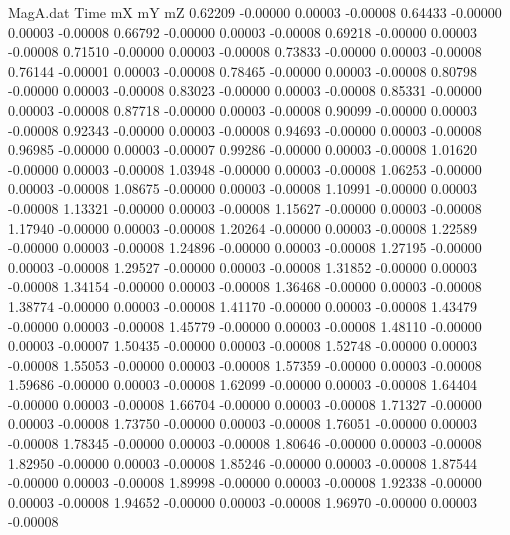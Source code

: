 \begin{filecontents}{MagA.dat}
Time mX mY mZ
   0.62209   -0.00000    0.00003   -0.00008
   0.64433   -0.00000    0.00003   -0.00008
   0.66792   -0.00000    0.00003   -0.00008
   0.69218   -0.00000    0.00003   -0.00008
   0.71510   -0.00000    0.00003   -0.00008
   0.73833   -0.00000    0.00003   -0.00008
   0.76144   -0.00001    0.00003   -0.00008
   0.78465   -0.00000    0.00003   -0.00008
   0.80798   -0.00000    0.00003   -0.00008
   0.83023   -0.00000    0.00003   -0.00008
   0.85331   -0.00000    0.00003   -0.00008
   0.87718   -0.00000    0.00003   -0.00008
   0.90099   -0.00000    0.00003   -0.00008
   0.92343   -0.00000    0.00003   -0.00008
   0.94693   -0.00000    0.00003   -0.00008
   0.96985   -0.00000    0.00003   -0.00007
   0.99286   -0.00000    0.00003   -0.00008
   1.01620   -0.00000    0.00003   -0.00008
   1.03948   -0.00000    0.00003   -0.00008
   1.06253   -0.00000    0.00003   -0.00008
   1.08675   -0.00000    0.00003   -0.00008
   1.10991   -0.00000    0.00003   -0.00008
   1.13321   -0.00000    0.00003   -0.00008
   1.15627   -0.00000    0.00003   -0.00008
   1.17940   -0.00000    0.00003   -0.00008
   1.20264   -0.00000    0.00003   -0.00008
   1.22589   -0.00000    0.00003   -0.00008
   1.24896   -0.00000    0.00003   -0.00008
   1.27195   -0.00000    0.00003   -0.00008
   1.29527   -0.00000    0.00003   -0.00008
   1.31852   -0.00000    0.00003   -0.00008
   1.34154   -0.00000    0.00003   -0.00008
   1.36468   -0.00000    0.00003   -0.00008
   1.38774   -0.00000    0.00003   -0.00008
   1.41170   -0.00000    0.00003   -0.00008
   1.43479   -0.00000    0.00003   -0.00008
   1.45779   -0.00000    0.00003   -0.00008
   1.48110   -0.00000    0.00003   -0.00007
   1.50435   -0.00000    0.00003   -0.00008
   1.52748   -0.00000    0.00003   -0.00008
   1.55053   -0.00000    0.00003   -0.00008
   1.57359   -0.00000    0.00003   -0.00008
   1.59686   -0.00000    0.00003   -0.00008
   1.62099   -0.00000    0.00003   -0.00008
   1.64404   -0.00000    0.00003   -0.00008
   1.66704   -0.00000    0.00003   -0.00008
   1.71327   -0.00000    0.00003   -0.00008
   1.73750   -0.00000    0.00003   -0.00008
   1.76051   -0.00000    0.00003   -0.00008
   1.78345   -0.00000    0.00003   -0.00008
   1.80646   -0.00000    0.00003   -0.00008
   1.82950   -0.00000    0.00003   -0.00008
   1.85246   -0.00000    0.00003   -0.00008
   1.87544   -0.00000    0.00003   -0.00008
   1.89998   -0.00000    0.00003   -0.00008
   1.92338   -0.00000    0.00003   -0.00008
   1.94652   -0.00000    0.00003   -0.00008
   1.96970   -0.00000    0.00003   -0.00008

\end{filecontents}
